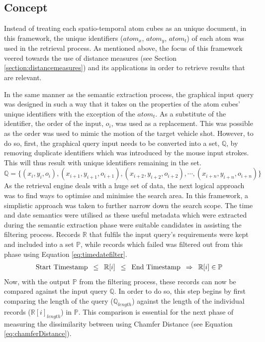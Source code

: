 \subsection{Concept}

Instead of treating each spatio-temporal atom cubes as an unique document, in this framework, the unique identifiers ($atom_x$, $atom_y$, $atom_t$) of each atom was used in the retrieval process. As mentioned above, the focus of this framework veered towards the use of distance measures (see Section \ref{section:distancemeasures}) and its applications in order to retrieve results that are relevant.

In the same manner as the semantic extraction process, the graphical input query was designed in such a way that it takes on the properties of the atom cubes' unique identifiers with the exception of the $atom_t$. As a substitute of the identifier, the order of the input, $o_{i}$, was used as a replacement. This was possible as the order was used to mimic the motion of the target vehicle shot. However, to do so, first, the graphical query input needs to be converted into a set, $\mathbb{Q}$, by removing duplicate identifiers which was introduced by the mouse input strokes. This will thus result with unique identifiers remaining in the set.
\begin{equation}
    \mathbb{Q} = \{ (x_i, y_i, o_i), (x_{i+1}, y_{i+1}, o_{i+1}), (x_{i+2}, y_{i+2}, o_{i+2}), \dotsb,(x_{i+n}, y_{i+n}, o_{i+n})\}
\end{equation}
As the retrieval engine deals with a huge set of data, the next logical approach was to find ways to optimise and minimise the search area. In this framework, a simplistic approach was taken to further narrow down the search scope.
The time and date semantics were utilised as these useful metadata which were extracted during the semantic extraction phase were suitable candidates in assisting the filtering process.
Records $\mathbb{R}$ that fulfils the input query's requirements were kept and included into a set $\mathbb{P}$, while records which failed was filtered out from this phase using Equation \ref{eq:timedatefilter}.
\begin{gather}
\label{eq:timedatefilter}
     \text{Start Timestamp} \hspace{.5em} \leq \hspace{.5em} \mathbb{R}[i] \hspace{.5em} \leq \hspace{.5em} \text{End Timestamp} \hspace{.5em} \Rightarrow \hspace{.5em} \mathbb{R}[i] \in \mathbb{P}
\end{gather}
Now, with the output $\mathbb{P}$ from the filtering process, these records can now be compared against the input query $\mathbb{Q}$. In order to do so, this step begins by first comparing the length of the query ($\mathbb{Q}_{length}$) against the length of the individual records ($\mathbb{R}[i]_{length}$) in $\mathbb{P}$. This comparison is essential for the next phase of measuring the dissimilarity between using Chamfer Distance (see Equation \ref{eq:chamferDistance}).

